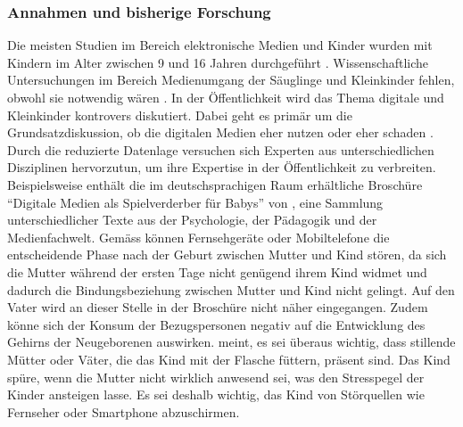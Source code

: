 \subsubsection{Annahmen und bisherige Forschung}\label{sec:Annahmen}
Die meisten Studien im Bereich elektronische Medien und Kinder wurden mit Kindern im Alter zwischen 9 und 16 Jahren durchgeführt \cite{Chaudron2015}. Wissenschaftliche Untersuchungen im Bereich Medienumgang der Säuglinge und Kleinkinder fehlen, obwohl sie notwendig wären \cite{Olafsson2014, Konitzer2017}. In der Öffentlichkeit wird das Thema digitale und Kleinkinder kontrovers diskutiert. Dabei geht es primär um die Grundsatzdiskussion, ob die digitalen Medien eher nutzen oder eher schaden \cite{Divsi2015}. Durch die reduzierte Datenlage versuchen sich Experten aus unterschiedlichen Disziplinen hervorzutun, um ihre Expertise in der Öffentlichkeit zu verbreiten. Beispielsweise enthält die im deutschsprachigen Raum erhältliche Broschüre \enquote{Digitale Medien als Spielverderber für Babys} von , eine Sammlung unterschiedlicher Texte aus der Psychologie, der Pädagogik und der Medienfachwelt. Gemäss  können Fernsehgeräte oder Mobiltelefone die entscheidende Phase nach der Geburt zwischen Mutter und Kind stören, da sich die Mutter während der ersten Tage nicht genügend ihrem Kind widmet und dadurch die Bindungsbeziehung zwischen Mutter und Kind nicht gelingt. Auf den Vater wird an dieser Stelle in der Broschüre nicht näher eingegangen. Zudem könne sich der Konsum der Bezugspersonen negativ auf die Entwicklung des Gehirns der Neugeborenen auswirken.  meint, es sei überaus wichtig, dass stillende Mütter oder Väter, die das Kind mit der Flasche füttern, präsent sind. Das Kind spüre, wenn die Mutter nicht wirklich anwesend sei, was den Stresspegel der Kinder ansteigen lasse. Es sei deshalb wichtig, das Kind von Störquellen wie Fernseher oder Smartphone abzuschirmen. 

